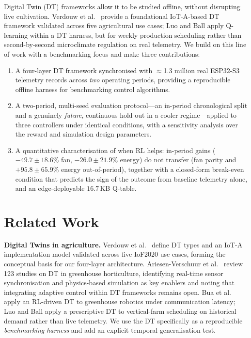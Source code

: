 \documentclass[conference]{IEEEtran}
\begin{document}
Digital Twin (DT) frameworks allow it to be studied offline, without disrupting
live cultivation. Verdouw et al.\ \cite{verdouw2021} provide a foundational
IoT-A-based DT framework validated across five agricultural use cases; Luo and
Ball \cite{luo2025} apply Q-learning within a DT harness, but for weekly
production scheduling rather than second-by-second microclimate regulation on
real telemetry. We build on this line of work with a benchmarking focus and make
three contributions:
\begin{enumerate}
\item A four-layer DT framework synchronised with $\approx$1.3 million real
ESP32-S3 telemetry records across \emph{two} operating periods, providing a
reproducible offline harness for benchmarking control algorithms.
\item A two-period, multi-seed evaluation protocol---an in-period chronological
split and a genuinely \emph{future}, continuous hold-out in a cooler
regime---applied to three controllers under identical conditions, with a
sensitivity analysis over the reward and simulation design parameters.
\item A quantitative characterisation of when RL helps: in-period gains
($-49.7\pm18.6\%$ fan, $-26.0\pm21.9\%$ energy) do not transfer (fan parity and
$+95.8\pm65.9\%$ energy out-of-period), together with a closed-form break-even
condition that predicts the sign of the outcome from baseline telemetry alone,
and an edge-deployable $16.7$\,KB Q-table.
\end{enumerate}

\section{Related Work}
\textbf{Digital Twins in agriculture.}
Verdouw et al.\ \cite{verdouw2021} define DT types and an IoT-A implementation
model validated across five IoF2020 use cases, forming the conceptual basis for
our four-layer architecture. Ariesen-Verschuur et al.\ \cite{ariesen2022} review
123 studies on DT in greenhouse horticulture, identifying real-time sensor
synchronisation and physics-based simulation as key enablers and noting that
integrating adaptive control within DT frameworks remains open. Bua et al.\
\cite{bua2025} apply an RL-driven DT to greenhouse robotics under communication
latency; Luo and Ball \cite{luo2025} apply a prescriptive DT to vertical-farm
scheduling on historical demand rather than live telemetry. We use the DT
specifically as a reproducible \emph{benchmarking harness} and add an explicit
temporal-generalisation test.
\end{document}
